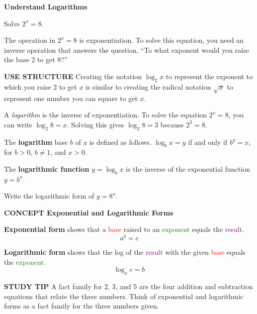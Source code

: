 \documentclass{article}
\newenvironment{concept-box}{}{}
\newenvironment{example}[1]{}{}
\newenvironment{tryit}[1]{}{}
\newcommand{\placeholder}[2]{}
\begin{document}
\begin{example}{1}
\textbf{Understand Logarithms}

Solve $2^x = 8$.

The operation in $2^x = 8$ is exponentiation. To solve this equation, you need an inverse operation that answers the question, ``To what exponent would you raise the base 2 to get 8?''

\textbf{USE STRUCTURE}
Creating the notation $\log_2 x$ to represent the exponent to which you raise 2 to get $x$ is similar to creating the radical notation $\sqrt{x}$ to represent one number you can square to get $x$.

\placeholder{diagram}{Callout: Division is the inverse of multiplication, so you can divide both sides by 2 to solve the equation. $2x = 8 \rightarrow \frac{2x}{2} = \frac{8}{2} \rightarrow x = 4$}

A \textit{logarithm} is the inverse of exponentiation.
To solve the equation $2^x = 8$, you can write $\log_2 8 = x$. Solving this gives $\log_2 8 = 3$ because $2^3 = 8$.

\placeholder{diagram}{Callout pointing to $\log_2 8$: This is read ``logarithm base 2 of 8'' or ``log base 2 of 8.''}

The \textbf{logarithm} base $b$ of $x$ is defined as follows.
$\log_b x = y$ if and only if $b^y = x$, for $b > 0$, $b \neq 1$, and $x > 0$.

The \textbf{logarithmic function} $y = \log_b x$ is the inverse of the exponential function $y = b^x$.
\end{example}

\begin{tryit}{1}
Write the logarithmic form of $y = 8^x$.
\end{tryit}

\begin{concept-box}
\textbf{CONCEPT Exponential and Logarithmic Forms}

\textbf{Exponential form} shows that a \textcolor{red}{base} raised to an \textcolor{green}{exponent} equals the \textcolor{purple}{result}.
$$a^b = c$$

\textbf{Logarithmic form} shows that the log of the \textcolor{purple}{result} with the given \textcolor{red}{base} equals the \textcolor{green}{exponent}.
$$\log_a c = b$$

\placeholder{diagram}{Callout pointing to $c$: When written in logarithmic form, the number that was the result of the exponential equation is often called the argument.}

\textbf{STUDY TIP}
A fact family for 2, 3, and 5 are the four addition and subtraction equations that relate the three numbers. Think of exponential and logarithmic forms as a fact family for the three numbers given.
\end{concept-box}
\end{document}
